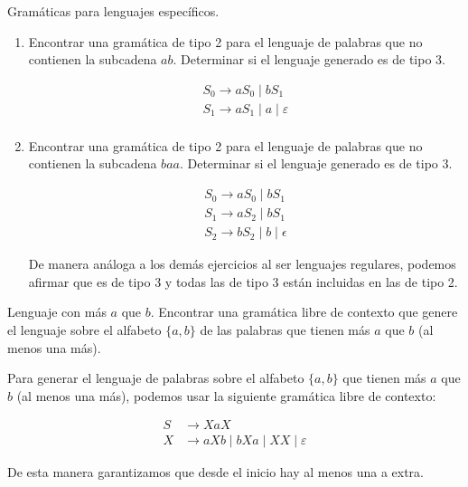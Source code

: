 \documentclass[12pt]{report} %
\begin{document}
\begin{ejercicio}
Gramáticas para lenguajes específicos.

\begin{enumerate}[label=\alph*)]
    \item Encontrar una gramática de tipo 2 para el lenguaje de palabras que no contienen la subcadena $ab$.  
    Determinar si el lenguaje generado es de tipo 3.

    \begin{solucion}[a]

    \begin{align*}
    S_0  \rightarrow aS_0  \mid bS_1 \\
    S_1  \rightarrow aS_1 \mid a \mid \varepsilon \\
    \end{align*}

    \end{solucion}

    \item Encontrar una gramática de tipo 2 para el lenguaje de palabras que no contienen la subcadena $baa$.  
    Determinar si el lenguaje generado es de tipo 3.

    \begin{solucion}[b]
    \begin{align*}
    S_0  \rightarrow aS_0  \mid bS_1 \\
    S_1  \rightarrow aS_2 \mid bS_1 \\
    S_2  \rightarrow bS_2 \mid b  \mid \epsilon
    \end{align*}

    De manera análoga a los demás ejercicios al ser lenguajes regulares, podemos afirmar que es de tipo 3 y todas las de tipo 3 están incluidas en las de tipo 2.

    \end{solucion}

\end{enumerate}

\end{ejercicio}

\begin{ejercicio}
Lenguaje con más $a$ que $b$. Encontrar una gramática libre de contexto que genere el lenguaje sobre el alfabeto $\{a, b\}$ de las palabras que tienen más $a$ que $b$ (al menos una más).
\end{ejercicio}

\begin{solucion}

Para generar el lenguaje de palabras sobre el alfabeto $\{a, b\}$ que tienen más $a$ que $b$ (al menos una más), podemos usar la siguiente gramática libre de contexto:

\begin{align*}
S &\to XaX \\
X &\to aXb \mid bXa \mid XX \mid \varepsilon
\end{align*}

De esta manera garantizamos que desde el inicio hay al menos una a extra.


\end{solucion}
\end{document}
